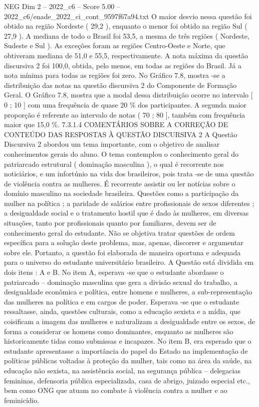 \begin{textsample}{NEG Dim 2 – 2022\_c6 – Score 5.00 – 2022\_c6/enade\_2022\_ci\_cont\_9597f67a94.txt}
O maior desvio nessa questão foi obtido na região Nordeste ( 29,2 ), enquanto o menor foi obtido na região Sul ( 27,9 ).
A mediana de todo o Brasil foi 53,5, a mesma de três regiões ( Nordeste, Sudeste e Sul ).
As exceções foram as regiões Centro-Oeste e Norte, que obtiveram mediana de 51,0 e 55,5, respectivamente.
A nota máxima da questão discursiva 2 foi 100,0, obtida, pelo menos, em todas as regiões do Brasil.
Já a nota mínima para todas as regiões foi zero.
No Gráfico 7.8, mostra -se a distribuição das notas na questão discursiva 2 do Componente de Formação Geral.
O Gráfico 7.8, mostra que a modal dessa distribuição ocorre no intervalo [ 0 ; 10 ] com uma frequência de quase 20 \% dos participantes.
A segunda maior proporção é referente ao intervalo de notas ( 70 ; 80 ], também com frequência maior que 15,0 \%. 7.3.1.4 COMENTÁRIOS SOBRE A CORREÇÃO DE CONTEÚDO DAS RESPOSTAS À QUESTÃO DISCURSIVA 2 A Questão Discursiva 2 abordou um tema importante, com o objetivo de analisar conhecimentos gerais do aluno.
O tema contemplou o conhecimento geral do patriarcado estrutural ( dominação masculina ), o qual é recorrente nos noticiários, e um infortúnio na vida dos brasileiros, pois trata -se de uma questão de violência contra as mulheres.
É recorrente assistir ou ler notícias sobre o domínio masculino na sociedade brasileira.
Questões como a participação da mulher na política ; a paridade de salários entre profissionais de sexos diferentes ; a desigualdade social e o tratamento hostil que é dado às mulheres, em diversas situações, tanto por profissionais quanto por familiares, devem ser de conhecimento geral do estudante.
Não se objetiva tratar questões de ordem específica para a solução deste problema, mas, apenas, discorrer e argumentar sobre ele.
Portanto, a questão foi elaborada de maneira oportuna e adequada para o universo do estudante universitário brasileiro.
A Questão está dividida em dois itens : A e B.
No item A, esperava -se que o estudante abordasse o patriarcado – dominação masculina que gera a divisão sexual do trabalho, a desigualdade econômica e política, entre homens e mulheres, a sub-representação das mulheres na política e em cargos de poder.
Esperava -se que o estudante ressaltasse, ainda, questões culturais, como a educação sexista e a mídia, que coisificam a imagem das mulheres e naturalizam a desigualdade entre os sexos, de forma a considerar os homens como dominantes, enquanto as mulheres são historicamente tidas como submissas e incapazes.
No item B, era esperado que o estudante apresentasse a importância do papel do Estado na implementação de políticas públicas voltadas à proteção da mulher, tais como na área da saúde, na educação não sexista, na assistência social, na segurança pública – delegacias femininas, defensoria pública especializada, casa de abrigo, juizado especial etc., bem como ONG que atuam no combate à violência contra a mulher e ao feminicídio.

\end{textsample}
